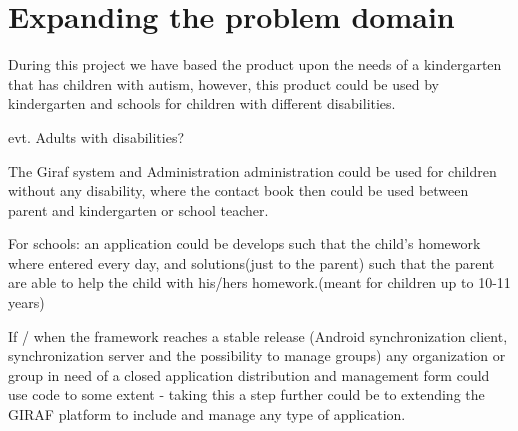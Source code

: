 \section{Expanding the problem domain}

During this project we have based the product upon the needs of a kindergarten that has children with autism, however, this product could be used by kindergarten and schools for children with different disabilities.

evt. Adults with disabilities?


The Giraf system and Administration administration could be used for children without any disability, where the contact book then could be used between parent and kindergarten or school teacher. 

For schools: an application could be develops such that the child's homework where entered every day, and solutions(just to the parent) such that the parent are able to help the child with his/hers homework.(meant for children up to 10-11 years)


If / when the framework reaches a stable release (Android synchronization client, synchronization server and the possibility to manage groups) any organization or group in need of a closed application distribution and management form could use code to some extent - taking this a step further could be to extending the GIRAF platform to include and manage any type of application. 

    